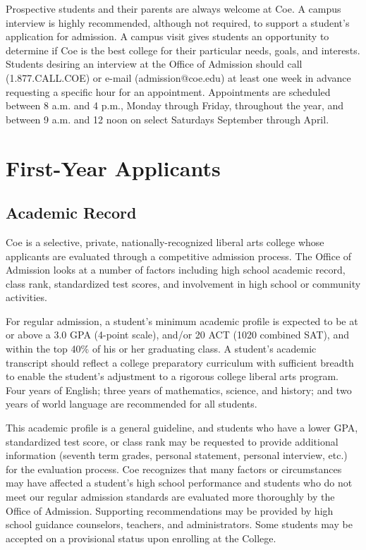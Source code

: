 \documentclass[
  letterpaper,
]{scrbook}
\begin{document}
Prospective students and their parents are always welcome at Coe. A
campus interview is highly recommended, although not required, to
support a student's application for admission. A campus visit gives
students an opportunity to determine if Coe is the best college for
their particular needs, goals, and interests. Students desiring an
interview at the Office of Admission should call (1.877.CALL.COE) or
e-mail (admission@coe.edu) at least one week in advance requesting a
specific hour for an appointment. Appointments are scheduled between 8
a.m. and 4 p.m., Monday through Friday, throughout the year, and between
9 a.m. and 12 noon on select Saturdays September through April.

\section{First-Year Applicants}\label{first-year-applicants}

\subsection{Academic Record}\label{academic-record}

Coe is a selective, private, nationally-recognized liberal arts college
whose applicants are evaluated through a competitive admission process.
The Office of Admission looks at a number of factors including high
school academic record, class rank, standardized test scores, and
involvement in high school or community activities.

For regular admission, a student's minimum academic profile is expected
to be at or above a 3.0 GPA (4-point scale), and/or 20 ACT (1020
combined SAT), and within the top 40\% of his or her graduating class. A
student's academic transcript should reflect a college preparatory
curriculum with sufficient breadth to enable the student's adjustment to
a rigorous college liberal arts program. Four years of English; three
years of mathematics, science, and history; and two years of world
language are recommended for all students.

This academic profile is a general guideline, and students who have a
lower GPA, standardized test score, or class rank may be requested to
provide additional information (seventh term grades, personal statement,
personal interview, etc.) for the evaluation process. Coe recognizes
that many factors or circumstances may have affected a student's high
school performance and students who do not meet our regular admission
standards are evaluated more thoroughly by the Office of Admission.
Supporting recommendations may be provided by high school guidance
counselors, teachers, and administrators. Some students may be accepted
on a provisional status upon enrolling at the College.
\end{document}
